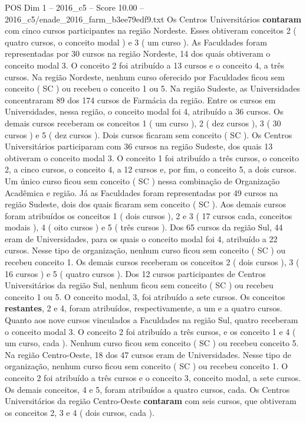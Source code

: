 \begin{textsample}{POS Dim 1 – 2016\_c5 – Score 10.00 – 2016\_c5/enade\_2016\_farm\_b3ee79edf9.txt}
Os Centros Universitários \textbf{contaram} com cinco cursos participantes na região Nordeste.
Esses obtiveram conceitos 2 ( quatro cursos, o conceito modal ) e 3 ( um curso ).
As Faculdades foram representadas por 30 cursos na região Nordeste, 14 dos quais obtiveram o conceito modal 3.
O conceito 2 foi atribuído a 13 cursos e o conceito 4, a três cursos.
Na região Nordeste, nenhum curso oferecido por Faculdades ficou sem conceito ( SC ) ou recebeu o conceito 1 ou 5.
Na região Sudeste, as Universidades concentraram 89 dos 174 cursos de Farmácia da região.
Entre os cursos em Universidades, nessa região, o conceito modal foi 4, atribuído a 36 cursos.
Os demais cursos receberam os conceitos 1 ( um curso ), 2 ( dez cursos ), 3 ( 30 cursos ) e 5 ( dez cursos ).
Dois cursos ficaram sem conceito ( SC ).
Os Centros Universitários participaram com 36 cursos na região Sudeste, dos quais 13 obtiveram o conceito modal 3.
O conceito 1 foi atribuído a três cursos, o conceito 2, a cinco cursos, o conceito 4, a 12 cursos e, por fim, o conceito 5, a dois cursos.
Um único curso ficou sem conceito ( SC ) nessa combinação de Organização Acadêmica e região.
Já as Faculdades foram representadas por 49 cursos na região Sudeste, dois dos quais ficaram sem conceito ( SC ).
Aos demais cursos foram atribuídos os conceitos 1 ( dois cursos ), 2 e 3 ( 17 cursos cada, conceitos modais ), 4 ( oito cursos ) e 5 ( três cursos ).
Dos 65 cursos da região Sul, 44 eram de Universidades, para os quais o conceito modal foi 4, atribuído a 22 cursos.
Nesse tipo de organização, nenhum curso ficou sem conceito ( SC ) ou recebeu conceito 1.
Os demais cursos receberam os conceitos 2 ( dois cursos ), 3 ( 16 cursos ) e 5 ( quatro cursos ).
Dos 12 cursos participantes de Centros Universitários da região Sul, nenhum ficou sem conceito ( SC ) ou recebeu conceito 1 ou 5.
O conceito modal, 3, foi atribuído a sete cursos.
Os conceitos \textbf{restantes}, 2 e 4, foram atribuídos, respectivamente, a um e a quatro cursos.
Quanto aos nove cursos vinculados a Faculdades na região Sul, quatro receberam o conceito modal 3.
O conceito 2 foi atribuído a três cursos, e os conceito 1 e 4 ( um curso, cada ).
Nenhum curso ficou sem conceito ( SC ) ou recebeu conceito 5.
Na região Centro-Oeste, 18 dos 47 cursos eram de Universidades.
Nesse tipo de organização, nenhum curso ficou sem conceito ( SC ) ou recebeu conceito 1.
O conceito 2 foi atribuído a três cursos e o conceito 3, conceito modal, a sete cursos.
Os demais conceitos, 4 e 5, foram atribuídos a quatro cursos, cada.
Os Centros Universitários da região Centro-Oeste \textbf{contaram} com seis cursos, que obtiveram os conceitos 2, 3 e 4 ( dois cursos, cada ).

\end{textsample}
